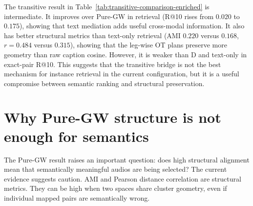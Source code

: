 \begin{table}[H]
\centering
\small
{}
\caption{Non-direct image-to-audio methods on the canonical pair. C-transitive improves substantially over Pure-GW in exact-pair retrieval, but it does not match direct caption-cost retrieval. Structurally, it is stronger than text-only and D in AMI and $r$, but weaker than Pure-GW.}
\label{tab:transitive-comparison-enriched}
\end{table}

The transitive result in Table~\ref{tab:transitive-comparison-enriched} is intermediate. It improves over Pure-GW in retrieval (R@10 rises from $0.020$ to $0.175$), showing that text mediation adds useful cross-modal information. It also has better structural metrics than text-only retrieval (AMI $0.220$ versus $0.168$, $r=0.484$ versus $0.315$), showing that the leg-wise OT plans preserve more geometry than raw caption cosine. However, it is weaker than D and text-only in exact-pair R@10. This suggests that the transitive bridge is not the best mechanism for instance retrieval in the current configuration, but it is a useful compromise between semantic ranking and structural preservation.


\section{Why Pure-GW structure is not enough for semantics}
\label{sec:results-gw-semantics}

The Pure-GW result raises an important question: does high structural alignment mean that semantically meaningful audios are being selected? The current evidence suggests caution. AMI and Pearson distance correlation are structural metrics. They can be high when two spaces share cluster geometry, even if individual mapped pairs are semantically wrong.

